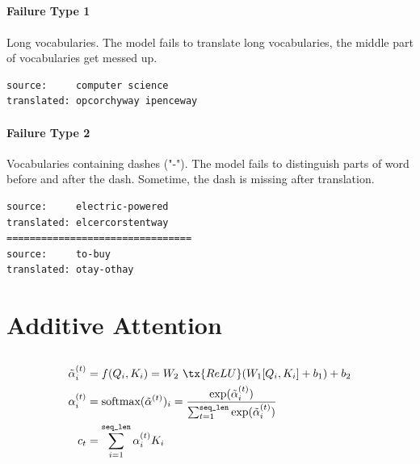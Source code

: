 \documentclass{article}
\begin{document}
	\subsection{}
\paragraph{Failure Type 1} Long vocabularies. The model fails to translate long vocabularies, the middle part of vocabularies get messed up.
\begin{lstlisting}
source:		computer science 
translated:	opcorchyway ipenceway
\end{lstlisting}
\paragraph{Failure Type 2} Vocabularies containing dashes ("-"). The model fails to distinguish parts of word before and after the dash. Sometime, the dash is missing after translation.
\begin{lstlisting}
source:		electric-powered 
translated:	elcercorstentway
================================
source:		to-buy 
translated:	otay-othay
\end{lstlisting}
	
	\section{Additive Attention}
	\subsection{}
	\begin{align}
		\tilde{\alpha}_i^{(t)} &= f(Q_i, K_i) = W_2\ \tx{ReLU}(W_1 [Q_i, K_i] + b_1) + b_2\\
		\alpha_i^{(t)} &= \text{softmax}(\tilde{\alpha}^{(t)})_i = \frac{\exp(\tilde{\alpha}_i^{(t)})}{\sum_{t=1}^\texttt{seq\_len} \exp(\tilde{\alpha}_i^{(t)})} \\
		c_t &= \sum_{i	=1}^\texttt{seq\_len} \alpha_i^{(t)} K_i
	\end{align}
\end{document}
